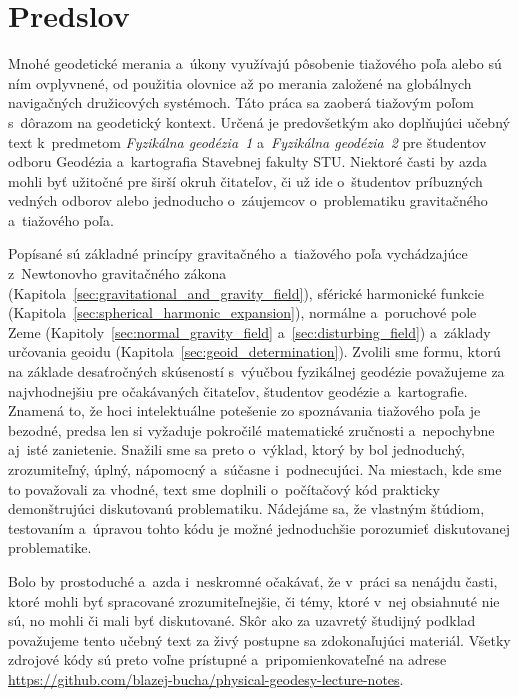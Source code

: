 \documentclass[a4paper, 12pt]{book}
\begin{document}

\chapter*{Predslov}

Mnohé geodetické merania a~úkony využívajú pôsobenie tiažového poľa alebo sú
ním ovplyvnené, od použitia olovnice až po merania založené na globálnych
navigačných družicových systémoch.  Táto práca sa zaoberá tiažovým poľom
s~dôrazom na geodetický kontext.  Určená je predovšetkým ako doplňujúci učebný
text k~predmetom \emph{Fyzikálna geodézia~1} a~\emph{Fyzikálna geodézia~2} pre
študentov odboru Geodézia a~kartografia Stavebnej fakulty STU.  Niektoré časti
by azda mohli byť užitočné pre širší okruh čitateľov, či už ide o~študentov
príbuzných vedných odborov alebo jednoducho o~záujemcov o~problematiku
gravitačného a~tiažového poľa.

Popísané sú základné princípy gravitačného a~tiažového poľa vychádzajúce
z~Newtonovho gravitačného zákona
(Kapitola~\ref{sec:gravitational_and_gravity_field}), sférické harmonické
funkcie (Kapitola~\ref{sec:spherical_harmonic_expansion}), normálne a~poruchové
pole Zeme (Kapitoly~\ref{sec:normal_gravity_field}
a~\ref{sec:disturbing_field}) a~základy určovania geoidu
(Kapitola~\ref{sec:geoid_determination}).  Zvolili sme formu, ktorú na základe
desaťročných skúseností s~výučbou fyzikálnej geodézie považujeme za
najvhodnejšiu pre očakávaných čitateľov, študentov geodézie a~kartografie.
Znamená to, že hoci intelektuálne potešenie zo spoznávania tiažového poľa je
bezodné, predsa len si vyžaduje pokročilé matematické zručnosti a~nepochybne
aj~isté zanietenie.  Snažili sme sa preto o~výklad, ktorý by bol jednoduchý,
zrozumiteľný, úplný, nápomocný a~súčasne i~podnecujúci.  Na miestach, kde sme
to považovali za vhodné, text sme doplnili o~počítačový kód prakticky
demonštrujúci diskutovanú problematiku.  Nádejáme sa, že vlastným štúdiom,
testovaním a~úpravou tohto kódu je možné jednoduchšie porozumieť diskutovanej
problematike.

Bolo by prostoduché a~azda i~neskromné očakávať, že v~práci sa nenájdu časti,
ktoré mohli byť spracované zrozumiteľnejšie, či témy, ktoré v~nej obsiahnuté
nie sú, no mohli či mali byť diskutované.  Skôr ako za uzavretý študijný
podklad považujeme tento učebný text za živý postupne sa zdokonaľujúci
materiál.  Všetky zdrojové kódy sú preto voľne prístupné a~pripomienkovateľné
na adrese \url{https://github.com/blazej-bucha/physical-geodesy-lecture-notes}.
\end{document}
